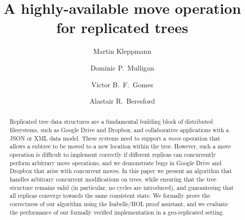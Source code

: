 \documentclass[sigplan,anonymous]{acmart}
\begin{document}
\title{A highly-available move operation for replicated trees}

\author{Martin Kleppmann}

\author{Dominic P.\ Mulligan}

\author{Victor B.\ F.\ Gomes}

\author{Alastair R.\ Beresford}


\begin{abstract}
    Replicated tree data structures are a fundamental building block of distributed filesystems, such as Google Drive and Dropbox, and collaborative applications with a JSON or XML data model.
    These systems need to support a \emph{move} operation that allows a subtree to be moved to a new location within the tree.
    However, such a move operation is difficult to implement correctly if different replicas can concurrently perform arbitrary move operations, and we demonstrate bugs in Google Drive and Dropbox that arise with concurrent moves.
    In this paper we present an algorithm that handles arbitrary concurrent modifications on trees, while ensuring that the tree structure remains valid (in particular, no cycles are introduced), and guaranteeing that all replicas converge towards the same consistent state.
    We formally prove the correctness of our algorithm using the Isabelle/HOL proof assistant, and we evaluate the performance of our formally verified implementation in a geo-replicated setting.
\end{abstract}
\end{document}
